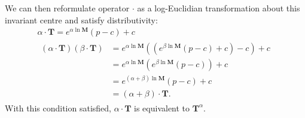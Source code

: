         We can then reformulate operator $\cdot$ as a log-Euclidian transformation about this invariant centre and satisfy distributivity:
        \begin{gather}
          \alpha \cdot \mathbf{T} = e^{\alpha\ln\mathbf{M}}(p - c) + c \label{eqn:affine_cdot} \\
          \begin{split}
            (\alpha \cdot \mathbf{T})(\beta \cdot \mathbf{T}) &= e^{\alpha\ln\mathbf{M}}((e^{\beta\ln\mathbf{M}}(p - c) + c) - c) + c \\
                                                              &= e^{\alpha\ln\mathbf{M}}(e^{\beta\ln\mathbf{M}}(p - c)) + c \\
                                                              &= e^{(\alpha + \beta)\ln\mathbf{M}}(p - c) + c \\
                                                              &= (\alpha + \beta) \cdot \mathbf{T}.
          \end{split}
        \end{gather}
        With this condition satisfied, $\alpha\cdot\mathbf{T}$ is equivalent to $\mathbf{T}^{\alpha}$.
        
